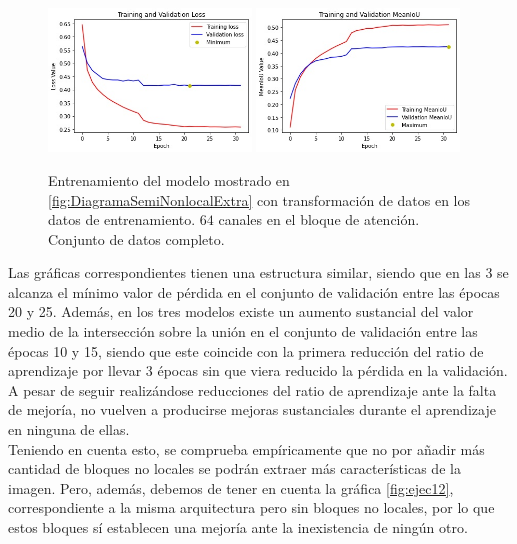 \begin{figure}[h!]
  \centering
  \includegraphics[width=0.48\textwidth]{../../modelos-entrenados/unet-semnonlocal-conv/ejecucion11/loss}
  \includegraphics[width=0.48\textwidth]{../../modelos-entrenados/unet-semnonlocal-conv/ejecucion11/iou}
  \caption{Entrenamiento del modelo mostrado en \autoref{fig:DiagramaSemiNonlocalExtra} con transformación de datos en los datos de entrenamiento. $64$ canales en el bloque de atención. Conjunto de datos completo.}
  \label{fig:ejec11}
\end{figure}
Las gráficas correspondientes tienen una estructura similar, siendo que en las 3 se alcanza el mínimo valor de pérdida en el conjunto de validación entre las épocas 20 y 25. Además, en los tres modelos existe un aumento  sustancial del valor medio de la intersección sobre la unión en el conjunto de validación entre las épocas 10 y 15, siendo que este coincide con la primera reducción del ratio de aprendizaje por llevar 3 épocas sin que viera reducido la pérdida en la validación.\\

\newpage
A pesar de seguir realizándose reducciones del ratio de aprendizaje ante la falta de mejoría, no vuelven a producirse mejoras sustanciales durante el aprendizaje en ninguna de ellas.\\

Teniendo en cuenta esto, se comprueba empíricamente que no por añadir más cantidad de bloques no locales se podrán extraer más características de la imagen. Pero, además, debemos de tener en cuenta la gráfica \autoref{fig:ejec12}, correspondiente a la misma arquitectura pero sin bloques no locales, por lo que estos bloques sí establecen una mejoría ante la inexistencia de ningún otro.\\

